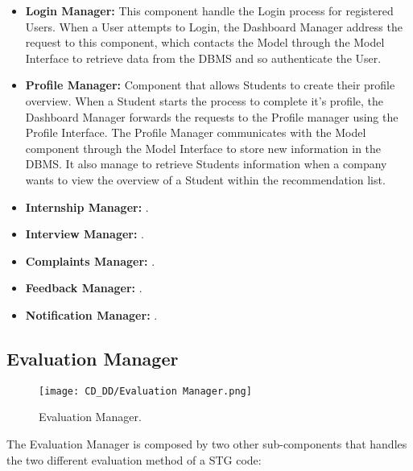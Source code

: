 \begin{itemize}
    \item \textbf{Login Manager:} This component handle the Login process for registered Users. When a User attempts to Login, the Dashboard Manager address the request to this component, which contacts the Model through the Model Interface to retrieve data from the DBMS and so authenticate the User. 
    \item \textbf{Profile Manager:} Component that allows Students to create their profile overview. When a Student starts the process to complete it's profile, the Dashboard Manager forwards the requests to the Profile manager using the Profile Interface. The Profile Manager communicates with the Model component through the Model Interface to store new information in the DBMS. It also manage to retrieve Students information when a company wants to view the overview of a Student within the recommendation list.
    \item \textbf{Internship Manager:} .
    \item \textbf{Interview Manager:} .
    \item \textbf{Complaints Manager:} .
    \item \textbf{Feedback Manager:} .
    \item \textbf{Notification Manager:} .
\end{itemize}

\subsection{Evaluation Manager}
\label{subsec:evaluation_manager}%

\begin{figure}[H]
    \begin{center}
        \texttt{[image: CD\_DD/Evaluation Manager.png]}
        \caption{Evaluation Manager.}
        \label{fig:evaluation_manager}%
    \end{center}
\end{figure}

\noindent The Evaluation Manager is composed by two other sub-components that handles the two different evaluation method of a STG code:

